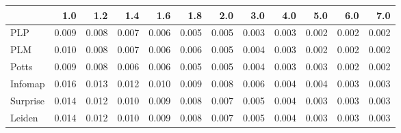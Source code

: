 \begin{tabular}{lrrrrrrrrrrr}
\toprule
{} &   1.0 &   1.2 &   1.4 &   1.6 &   1.8 &   2.0 &   3.0 &   4.0 &   5.0 &   6.0 &   7.0 \\
\midrule
PLP      & 0.009 & 0.008 & 0.007 & 0.006 & 0.005 & 0.005 & 0.003 & 0.003 & 0.002 & 0.002 & 0.002 \\
PLM      & 0.010 & 0.008 & 0.007 & 0.006 & 0.006 & 0.005 & 0.004 & 0.003 & 0.002 & 0.002 & 0.002 \\
Potts    & 0.009 & 0.008 & 0.006 & 0.006 & 0.005 & 0.005 & 0.004 & 0.003 & 0.003 & 0.002 & 0.002 \\
Infomap  & 0.016 & 0.013 & 0.012 & 0.010 & 0.009 & 0.008 & 0.006 & 0.004 & 0.004 & 0.003 & 0.003 \\
Surprise & 0.014 & 0.012 & 0.010 & 0.009 & 0.008 & 0.007 & 0.005 & 0.004 & 0.003 & 0.003 & 0.003 \\
Leiden   & 0.014 & 0.012 & 0.010 & 0.009 & 0.008 & 0.007 & 0.005 & 0.004 & 0.003 & 0.003 & 0.003 \\
\bottomrule
\end{tabular}
